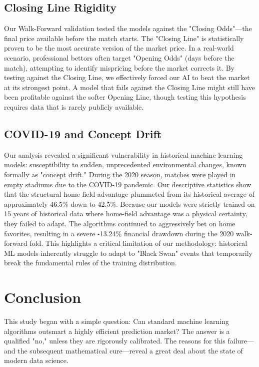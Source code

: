 \documentclass[pdflatex,sn-basic]{sn-jnl}
\begin{document}
\subsection{Closing Line Rigidity}
Our Walk-Forward validation tested the models against the "Closing Odds"—the final price available before the match starts. The "Closing Line" is statistically proven to be the most accurate version of the market price. In a real-world scenario, professional bettors often target "Opening Odds" (days before the match), attempting to identify mispricing before the market corrects it. By testing against the Closing Line, we effectively forced our AI to beat the market at its strongest point. A model that fails against the Closing Line might still have been profitable against the softer Opening Line, though testing this hypothesis requires data that is rarely publicly available.

\subsection{COVID-19 and Concept Drift}
Our analysis revealed a significant vulnerability in historical machine learning models: susceptibility to sudden, unprecedented environmental changes, known formally as "concept drift." During the 2020 season, matches were played in empty stadiums due to the COVID-19 pandemic. Our descriptive statistics show that the structural home-field advantage plummeted from its historical average of approximately 46.5\% down to 42.5\%. Because our models were strictly trained on 15 years of historical data where home-field advantage was a physical certainty, they failed to adapt. The algorithms continued to aggressively bet on home favorites, resulting in a severe -13.24\% financial drawdown during the 2020 walk-forward fold. This highlights a critical limitation of our methodology: historical ML models inherently struggle to adapt to "Black Swan" events that temporarily break the fundamental rules of the training distribution.

\section{Conclusion}

This study began with a simple question: Can standard machine learning algorithms outsmart a highly efficient prediction market? The answer is a qualified "no," unless they are rigorously calibrated. The reasons for this failure—and the subsequent mathematical cure—reveal a great deal about the state of modern data science.
\end{document}
